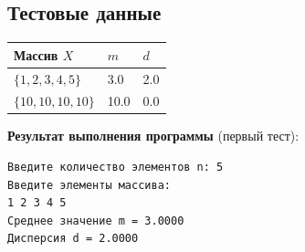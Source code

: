 \subsection{Тестовые данные}

\begin{center}
\begin{tabular}{l|ll}
\toprule
Массив $X$ & $m$ & $d$ \\
\midrule
$\{1,2,3,4,5\}$ & 3.0 & 2.0 \\
$\{10,10,10,10\}$ & 10.0 & 0.0 \\
\bottomrule
\end{tabular}
\end{center}

\textbf{Результат выполнения программы} (первый тест):
\begin{lstlisting}[language={},basicstyle=\ttfamily\small,frame=single]
Введите количество элементов n: 5
Введите элементы массива:
1 2 3 4 5
Среднее значение m = 3.0000
Дисперсия d = 2.0000
\end{lstlisting}
